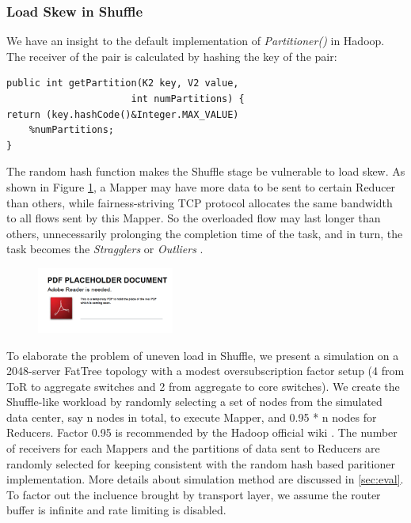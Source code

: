 \subsubsection{Load Skew in Shuffle}

We have an insight to the default implementation of \emph{Partitioner()} in Hadoop. The receiver of the pair is calculated by hashing the key of the pair:

\begin{verbatim}
public int getPartition(K2 key, V2 value,  
                      int numPartitions) {  
return (key.hashCode()&Integer.MAX_VALUE) 
	%numPartitions;  
}  
\end{verbatim}

The random hash function makes the Shuffle stage be vulnerable to load skew. As shown in Figure \ref{fig:shuffle_uneven_load}, a Mapper may have more data to be sent to certain Reducer than others, while fairness-striving TCP protocol allocates the same bandwidth to all flows sent by this Mapper. So the overloaded flow may last longer than others, unnecessarily prolonging the completion time of the task, and in turn, the task becomes the \emph{Stragglers} or \emph{Outliers} \cite{Mantri} \cite{LATE}. 

\begin{figure}
  \centering
  \includegraphics[width=0.4\textwidth]{pic/placeholder}\\
  \caption{}
  \label{fig:shuffle_uneven_load}
\end{figure}

To elaborate the problem of uneven load in Shuffle, we present a simulation on a 2048-server FatTree topology with a modest oversubscription factor setup \cite{DatacenterDesign} (4 from ToR to aggregate switches and 2 from aggregate to core switches). We create the Shuffle-like workload by randomly selecting a set of nodes from the simulated data center, say n nodes in total, to execute Mapper, and 0.95 * n nodes for Reducers. Factor 0.95 is recommended by the Hadoop official wiki \cite{ReduceNum}. The number of receivers for each Mappers and the partitions of data sent to Reducers are randomly selected for keeping consistent with the random hash based paritioner implementation. More details about simulation method are discussed in \ref{sec:eval}. To factor out the incluence brought by transport layer, we assume the router buffer is infinite and rate limiting is disabled. 

